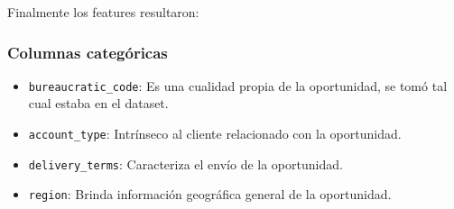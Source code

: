\documentclass[titlepage,a4paper]{article}
\begin{document}
Finalmente los features resultaron:

\subsubsection{Columnas categóricas}
\begin{itemize}
    \item \verb|bureaucratic_code|: Es una cualidad propia de la oportunidad, se tomó tal cual estaba en el dataset.
    \item \verb|account_type|: Intrínseco al cliente relacionado con la oportunidad.
    \item \verb|delivery_terms|: Caracteriza el envío de la oportunidad.
    \item \verb|region|: Brinda información geográfica general de la oportunidad.
\end{itemize}
\end{document}
